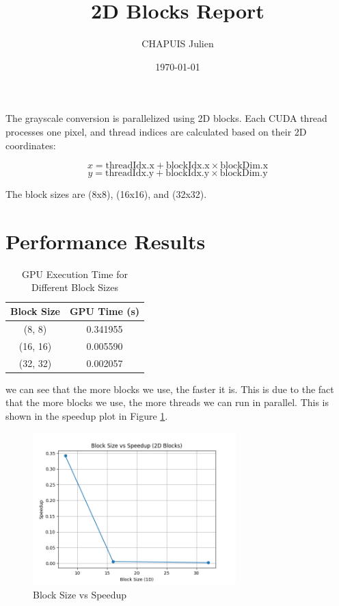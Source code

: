 \documentclass{article}
\title{2D Blocks Report}
\author{CHAPUIS Julien}
\date{\today}
\begin{document}
\section{}
The grayscale conversion is parallelized using 2D blocks. Each CUDA thread processes one pixel, and thread indices are calculated based on their 2D coordinates:

\[
x = \text{threadIdx.x} + \text{blockIdx.x} \times \text{blockDim.x}
\]
\[
y = \text{threadIdx.y} + \text{blockIdx.y} \times \text{blockDim.y}
\]

The block sizes are (8x8), (16x16), and (32x32).

\section{Performance Results}

\begin{table}[h]
\centering
\begin{tabular}{|c|c|}
\hline
\textbf{Block Size} & \textbf{GPU Time (s)} \\
\hline
(8, 8)   & 0.341955 \\
(16, 16) & 0.005590 \\
(32, 32) & 0.002057 \\
\hline
\end{tabular}
\caption{GPU Execution Time for Different Block Sizes}
\label{table:performance}
\end{table}

we can see that the more blocks we use, the faster it is. This is due to the fact that the more blocks we use, the more threads we can run in parallel. This is shown in the speedup plot in Figure \ref{fig:speedup_plot}.

\begin{figure}[h]
\centering
\includegraphics[width=0.7\textwidth]{block_size_vs_speedup.png}
\caption{Block Size vs Speedup}
\label{fig:speedup_plot}
\end{figure}
\end{document}
